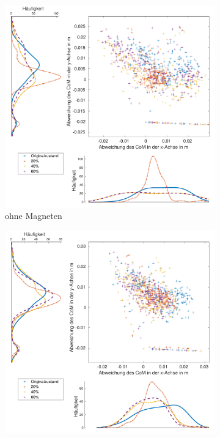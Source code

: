 \begin{landscape}
	\begin{figure}[tb]
		\centering
			\begin{subfigure}[c]{.45\linewidth}
				\centering
				\includegraphics[width=\linewidth]{Bilder/links_CoM_ohneM.pdf}
				\caption{ohne Magneten}
			\end{subfigure}
			\hfill
			\begin{subfigure}[c]{.45\linewidth}
				\centering
				\includegraphics[width=\linewidth]{Bilder/links_CoM_mitM.pdf}

\end{subfigure}
\end{figure}
\end{landscape}
